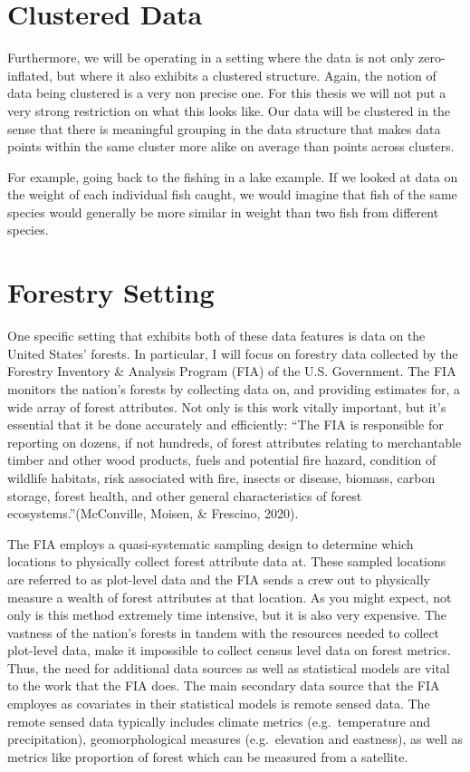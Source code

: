 \documentclass[12pt,twoside]{reedthesis}
\begin{document}
\hypertarget{clustered-data}{%
\section{Clustered Data}\label{clustered-data}}

Furthermore, we will be operating in a setting where the data is not only zero-inflated, but where it also exhibits a clustered structure. Again, the notion of data being clustered is a very non precise one. For this thesis we will not put a very strong restriction on what this looks like. Our data will be clustered in the sense that there is meaningful grouping in the data structure that makes data points within the same cluster more alike on average than points across clusters.

For example, going back to the fishing in a lake example. If we looked at data on the weight of each individual fish caught, we would imagine that fish of the same species would generally be more similar in weight than two fish from different species.

\hypertarget{forestry-setting}{%
\section{Forestry Setting}\label{forestry-setting}}

One specific setting that exhibits both of these data features is data on the United States' forests. In particular, I will focus on forestry data collected by the Forestry Inventory \& Analysis Program (FIA) of the U.S. Government. The FIA monitors the nation's forests by collecting data on, and providing estimates for, a wide array of forest attributes. Not only is this work vitally important, but it's essential that it be done accurately and efficiently: ``The FIA is responsible for reporting on dozens, if not hundreds, of forest attributes relating to merchantable timber and other wood products, fuels and potential fire hazard, condition of wildlife habitats, risk associated with fire, insects or disease, biomass, carbon storage, forest health, and other general characteristics of forest ecosystems.''(McConville, Moisen, \& Frescino, 2020).

The FIA employs a quasi-systematic sampling design to determine which locations to physically collect forest attribute data at. These sampled locations are referred to as plot-level data and the FIA sends a crew out to physically measure a wealth of forest attributes at that location. As you might expect, not only is this method extremely time intensive, but it is also very expensive. The vastness of the nation's forests in tandem with the resources needed to collect plot-level data, make it impossible to collect census level data on forest metrics. Thus, the need for additional data sources as well as statistical models are vital to the work that the FIA does. The main secondary data source that the FIA employes as covariates in their statistical models is remote sensed data. The remote sensed data typically includes climate metrics (e.g.~temperature and precipitation), geomorphological measures (e.g.~elevation and eastness), as well as metrics like proportion of forest which can be measured from a satellite.
\end{document}
